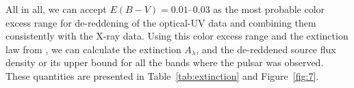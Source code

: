 \documentclass[pdftex,twocolumn]{aastex62}
\newcommand{\gp}[1]{{\color{blue} #1}}
\begin{document}
All in all, we can accept  
$E(B-V)=0.01$--0.03 as the most probable color excess range for 
de-reddening of the optical-UV data and combining them consistently with the X-ray data. 
Using this color excess range and the extinction 
law from \citet{Cardelli1989},
 we can calculate the extinction 
$A_{\lambda}$, and the  de-reddened source flux density  
or its upper bound for all the bands where the pulsar was observed. 
These quantities are  presented in Table~\ref{tab:extinction} and Figure~\ref{fig:7}.

\end{document}
